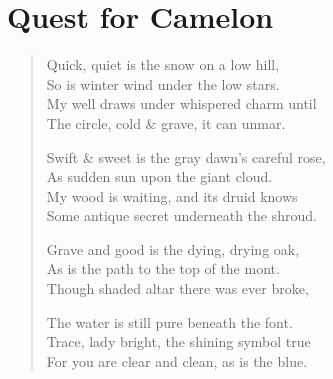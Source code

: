 \section{Quest for Camelon}

\begin{verse}
Quick, quiet is the snow on a low hill,\\
So is winter wind under the low stars.\\
My well draws under whispered charm until\\
The circle, cold \& grave, it can unmar.

Swift \& sweet is the gray dawn's careful rose,\\
As sudden sun upon the giant cloud.\\
My wood is waiting, and its druid knows\\
Some antique secret underneath the shroud.

Grave and good is the dying, drying oak,\\
As is the path to the top of the mont.\\
Though shaded altar there was ever broke,

The water is still pure beneath the font.\\
Trace, lady bright, the shining symbol true\\
For you are clear and clean, as is the blue.
\end{verse}



